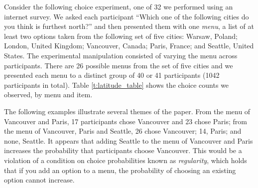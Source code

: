 \documentclass[11pt,letter]{article}
\newcommand{\menu}{menu}
\begin{document}
Consider the following choice experiment, one of 32 we performed using an internet survey.
We asked each participant ``Which one of the following cities do you think is furthest north?'' and then presented them with one {\em menu}, a list of at least two options taken from the following set of five cities: Warsaw, Poland; London, United Kingdom; Vancouver, Canada; Paris, France; and Seattle, United States.
The experimental manipulation consisted of varying the menu across participants.
There are 26 possible menus from the set of five cities and we presented each \menu{} to a distinct group of 40 or 41 participants (1042 participants in total).
Table \ref{t:latitude_table} shows the choice counts we observed, by menu and item.

\begin{table}
  
  \caption{Observed choice counts and proportions for the ``Latitude'' domain, where the prompt is ``Which one of the following cities do you think is furthest north?'' and the universe of items is $\{a,b,c,d,e\}$, where $a$ is Warsaw, Poland; $b$ is London, United Kingdom, $c$ is Vancouver, Canada; $d$ is Paris, France; and $e$ is Seattle, United States.
  Each row gives counts and proportions for the \menu{} shown in the first column.
  The second through sixth columns show the number of participants who chose the items $a$, $b$, $c$, $d$ and $e$, respectively, from the \menu{}.
  $n_A(x)$ is the number of participants who chose item $x$ from \menu{} $A$, $x = a, b, c, d, e$.
  Where an item is not in the \menu{}, a dash is displayed.
  Thus, a zero unambiguously means that an item was available but never chosen from the \menu{} in question. 
  The final five columns show the corresponding choice proportions.
  $\hat{P}_A(x)$ is the proportion of participants who chose item $x$ from \menu{} $A$.
  Analogous tables for all 32 domains are provided in the Supplementary Materials.}
  \label{t:latitude_table}
\end{table}

The following examples illustrate several themes of the paper.
From the menu of Vancouver and Paris, 17 participants chose Vancouver and 23 chose Paris; from the menu of Vancouver, Paris and Seattle, 26 chose Vancouver; 14, Paris; and none, Seattle.
It appears that adding Seattle to the menu of Vancouver and Paris increases the probability that participants choose Vancouver.
This would be a violation of a condition on choice probabilities known as {\em regularity}, which holds that if you add an option to a menu, the probability of choosing an existing option cannot increase.
\end{document}

